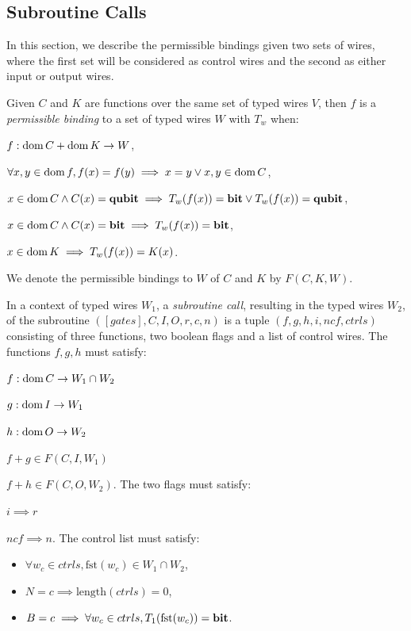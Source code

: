 

\subsection{Subroutine Calls} %
\label{sub:subroutine_calls}

In this section, we describe the permissible bindings given two
sets of wires, where the first set will be considered as control wires and
the second as either input or output wires.
\begin{definition}\label{def:permissible_bindings}
  Given $C$ and $K$ are 
  functions over the same set of typed wires $V$,
  then $f$ is a \emph{permissible binding} to a
  set of typed wires $W$ with  $T_w$ when:
  \bi
  \item $f: \operatorname*{dom} C + \operatorname*{dom} K \to W$,
  \item $\forall x, y\in \operatorname*{dom} f, f(x)=f(y) \implies x=y \vee x,y\in \operatorname*{dom} C$,
  \item $x\in \operatorname*{dom} C \wedge C(x) = \mathbf{{qubit}}
  \implies T_w(f(x)) = \mathbf{{bit}} \vee T_w(f(x)) = \mathbf{{qubit}}$,
  \item $x\in \operatorname*{dom} C \wedge C(x) = \mathbf{{bit}} \implies T_w(f(x)) = \mathbf{{bit}}$,
  \item $x\in \operatorname*{dom} K  \implies T_w(f(x)) = K(x)$.
  \ei
\end{definition}

We denote the permissible bindings to $W$ of $C$ and $K$ by $F(C,K,W)$.

\begin{definition}\label{def:subroutine_call}
  In a context of typed wires $W_1$,
  a \emph{subroutine call}, resulting in the typed wires $W_2$,
  of the subroutine $([gates],C,I,O,r,c,n)$
  is a tuple $(f,g,h,i,ncf,ctrls)$ consisting of three functions,
  two boolean flags and a list of control wires.
  The functions $f,g,h$ must satisfy:
  \bi
  \item $f:\operatorname*{dom} C \to W_1 \cap W_2$
  \item $g:\operatorname*{dom} I \to W_1$
  \item $h:\operatorname*{dom} O \to W_2$
  \item $f + g \in F(C,I,W_1)$
  \item $f + h \in F(C,O,W_2)$.
  \ei
  The two flags must satisfy:
  \bi
  \item $i \implies r$
  \item $ncf \implies n$.
  \ei
  The control list must satisfy:
  \begin{itemize}
    \item $\forall w_c \in ctrls, \text{fst}(w_c) \in W_1 \cap W_2$,
    \item $N = c \implies \text{length}(ctrls) = 0$,
    \item $B = c \implies \forall w_c \in ctrls, T_1(\text{fst}(w_c)) = \mathbf{{bit}}$.
  \end{itemize}
\end{definition}


